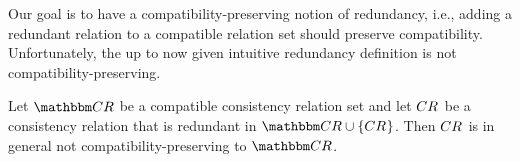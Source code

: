 
%     

Our goal is to have a compatibility-preserving notion of redundancy, i.e., adding a redundant relation to a compatible relation set should preserve compatibility.
Unfortunately, the up to now given intuitive redundancy definition is not compatibility-preserving.

\begin{proposition} \label{prop:redundantnotimpliescompatible}
    Let $\consistencyrelationset{CR}$ be a compatible consistency relation set and let $\consistencyrelation{CR}{}$ be a consistency relation that is redundant in $\consistencyrelationset{CR} \cup \setted{\consistencyrelation{CR}{}}$.
    Then $\consistencyrelation{CR}{}$ is in general not compatibility-preserving to $\consistencyrelationset{CR}$.
\end{proposition}

